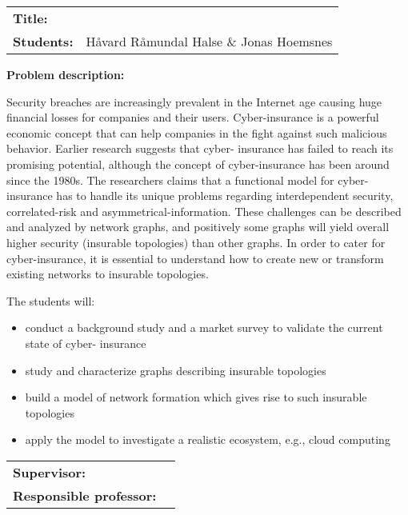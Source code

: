 \begin{titlingpage}

\noindent
\begin{tabular}{@{}p{4cm}l}
\textbf{Title:} 	& \thetitle \\
\textbf{Students:}	& Håvard Råmundal Halse \& Jonas Hoemsnes \\
\end{tabular}

\vspace{4ex}
\noindent\textbf{Problem description:}

Security breaches are increasingly prevalent in the Internet age causing huge financial losses
for companies and their users. Cyber-insurance is a powerful economic concept that can help
companies in the fight against such malicious behavior. Earlier research suggests that cyber-
insurance has failed to reach its promising potential, although the concept of cyber-insurance has
been around since the 1980s. The researchers claims that a functional model for cyber-insurance has to handle its unique problems regarding interdependent security, correlated-risk and asymmetrical-information. These challenges can be described and analyzed by network graphs, and positively some graphs will yield overall higher security (insurable topologies) than other graphs. In order to cater for cyber-insurance, it is essential to understand how to create new or transform existing networks to insurable topologies.

The students will:
\begin{itemize}

\item conduct a background study and a market survey to validate the current state of cyber-
insurance
\item study and characterize graphs describing insurable topologies
\item build a model of network formation which gives rise to such insurable topologies
\item apply the model to investigate a realistic ecosystem, e.g., cloud computing

\end{itemize}
\vspace{2ex}

\noindent
\begin{tabular}{@{}p{4cm}l}
\textbf{Supervisor:}			& \thesupervisor \\
\textbf{Responsible professor:} 	& \theprofessor \\
\end{tabular}

\end{titlingpage}